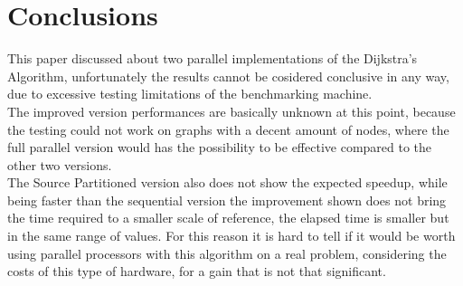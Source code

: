 \documentclass[
	a4paper, %
	12pt, %
]{class}
\begin{document}
\newpage
\section{Conclusions}

This paper discussed about two parallel implementations of the Dijkstra's Algorithm, unfortunately the results cannot be cosidered conclusive in any way,
due to excessive testing limitations of the benchmarking machine. \\

The improved version performances are basically unknown at this point, because the testing could not work on graphs with a decent amount of nodes,
where the full parallel version would has the possibility to be effective compared to the other two versions. \\

The Source Partitioned version also does not show the expected speedup, while being faster than the sequential version the improvement shown does not bring the
time required to a smaller scale of reference, the elapsed time is smaller but in the same range of values. For this reason it is hard to tell if it would be worth using
parallel processors with this algorithm on a real problem, considering the costs of this type of hardware, for a gain that is not that significant. \\

\printbibliography %

\end{document}
